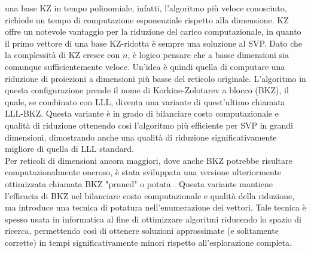 una base KZ in tempo polinomiale, infatti, l'algoritmo più veloce conosciuto, richiede un tempo
di computazione esponenziale rispetto alla dimensione. KZ offre un notevole vantaggio per la 
riduzione del carico computazionale, in quanto il primo vettore di una base KZ-ridotta è 
sempre una soluzione al SVP. Dato che la complessità di KZ
cresce con $n$, è logico pensare che a basse dimensioni sia comunque sufficientemente
veloce. Un'idea è quindi quella di computare
una riduzione di proiezioni a dimensioni più basse del reticolo originale.
L'algoritmo in questa configurazione prende il nome di Korkine-Zolotarev a blocco (BKZ), 
il quale, se combinato con LLL, diventa una variante di quest'ultimo chiamata LLL-BKZ. Questa
variante è in grado di bilanciare costo computazionale e qualità di riduzione ottenendo così
l'algoritmo più efficiente per SVP in grandi dimensioni, dimostrando anche una qualità di riduzione
significativamente migliore di quella di LLL standard. \\

Per reticoli di dimensioni ancora maggiori, dove anche BKZ potrebbe risultare computazionalmente oneroso, 
è stata sviluppata una versione ulteriormente ottimizzata chiamata BKZ "pruned" o potata \cite{BKZPRUNED}. Questa variante 
mantiene l'efficacia di BKZ nel bilanciare costo computazionale e qualità della riduzione, 
ma introduce una tecnica di potatura nell'enumerazione dei vettori. Tale tecnica è spesso usata in 
informatica al fine di ottimizzare algoritmi riducendo lo spazio di ricerca, permettendo così di ottenere 
soluzioni approssimate (e solitamente corrette) in tempi significativamente minori rispetto all'esplorazione completa.